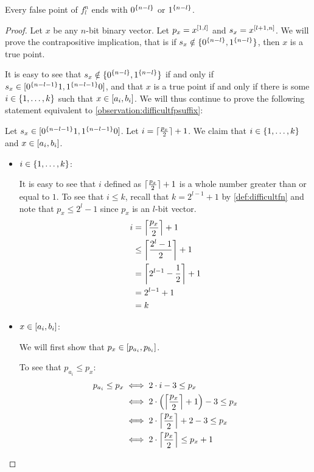 \begin{observation}
\label{observation:difficultfpsuffix}
Every false point of $f_l^n$ ends with $\rep{0}{n-l}$
or $\rep{1}{n-l}$.
\end{observation}

\begin{proof}
Let $x$ be any $n$-bit binary vector.
Let $p_x = \bits{x}{1}{l}$ and $s_x = \bits{x}{l+1}{n}$.
We will prove the contrapositive
implication,
that is
if $s_x \notin \curly{\rep{0}{n-l}, \rep{1}{n-l}}$,
then $x$ is a true point.

It is easy to see that
$s_x \notin \curly{\rep{0}{n-l}, \rep{1}{n-l}}$
if and only if
$s_x \in \interval{\rep{0}{n-l-1} 1}{\rep{1}{n-l-1} 0}$, and that $x$ is a true point
if and only if
there is some $i \in \curly{1, \ldots, k}$
such that $x \in \interval{a_i}{b_i}$.
We will thus continue to prove the following statement
equivalent to \cref{observation:difficultfpsuffix}:
\begin{claim}
\label{claim:difficultfpsuffix}
Let
$s_x \in \interval{\rep{0}{n-l-1} 1}{\rep{1}{n-l-1} 0}$.
Let $i = \ceil{\frac{p_x}{2}} + 1$.
We claim that $i \in \curly{1, \ldots, k}$
and $x \in \interval{a_i}{b_i}$.
\end{claim}

\begin{itemize}
\item $i \in \curly{1, \ldots, k}$:

It is easy to see that $i$
defined as $\ceil{\frac{p_x}{2}} + 1$
is a whole number greater than or equal to $1$.
To see that $i \leq k$,
recall that $k = 2^{l-1} + 1$ by \cref{def:difficultfn}
and note that $p_x \leq 2^l-1$
since $p_x$ is an $l$-bit vector.
\begin{align*}
i &= \ceil*{\frac{p_x}{2}} + 1 \\
&\leq \ceil*{\frac{2^l-1}{2}} + 1 \\
&= \ceil*{2^{l-1} - \frac{1}{2}} + 1 \\
&= 2^{l-1} + 1 \\
&= k
\end{align*}

\item $x \in \interval{a_i}{b_i}$:

We will first show that $p_x \in \interval{p_{a_i}}{p_{b_i}}$.

To see that $p_{a_i} \leq p_x$:
\begin{align}
p_{a_i} \leq p_x
&\iff 2 \cdot i - 3 \leq p_x \\
&\iff 2 \cdot \round*{\ceil*{\frac{p_x}{2}} + 1} - 3 \leq p_x \\
&\iff 2 \cdot \ceil*{\frac{p_x}{2}} + 2 - 3 \leq p_x \\
&\iff 2 \cdot \ceil*{\frac{p_x}{2}} \leq p_x + 1
\label{ineq:difficultprefix}
\end{align}


\end{itemize}
\end{proof}
